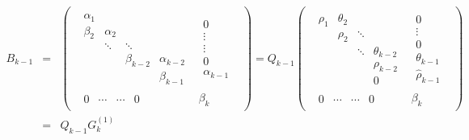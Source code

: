 \documentclass[11pt]{article}
\begin{document}
\begin{eqnarray*}
B_{k-1} &=&
\begin{pmatrix}\begin{array}{c|c}
\begin{matrix}
  \alpha_1  &          &         &      \\
  \beta_2   & \alpha_2 &         &      \\
            & \ddots   & \ddots  &      \\
            &          & \beta_{k-2} & \alpha_{k-2} \\
		        &          &         & \beta_{k-1}
 \end{matrix}
&  \begin{matrix} 0 \\ \vdots \\ \vdots \\ 0 \\ \alpha_{k-1} \end{matrix} \\
\hline
\begin{matrix} 0 & \cdots  & \cdots & 0  \end{matrix} & \beta_{k}
\end{array}\end{pmatrix}
 = Q_{k-1}
\begin{pmatrix}\begin{array}{c|c}
\begin{matrix}
 \rho_1     & \theta_2 &         &      \\
            & \rho_2   & \ddots  &      \\
            &          & \ddots  & \theta_{k-2}     \\
            &          &         & \rho_{k-2} \\
		    &          &         & 0 
 \end{matrix}
&  \begin{matrix} 0 \\ \vdots \\ 0 \\ \theta_{k-1} \\ \hat{\rho}_{k-1} \end{matrix} \\
\hline
\begin{matrix} 0 & \cdots  & \cdots & 0  \end{matrix} & \beta_{k}
\end{array}\end{pmatrix} \\
&=& Q_{k-1} G^{(1)}_k

\end{eqnarray*}
\end{document}
